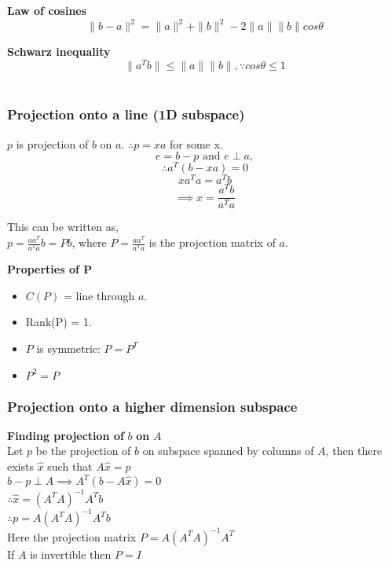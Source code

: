 \textbf{Law of cosines}
$$\|b - a\|^2 = \|a\|^2 + \|b\|^2 - 2\|a\|\|b\|cos\theta$$

\textbf{Schwarz inequality}
$$\|a^Tb\| \leq \|a\|\|b\|, \because cos\theta \leq 1$$\\

\subsubsection{Projection onto a line (1D subspace)}


$p$ is projection of $b$ on $a$. $\therefore p = xa $ for some x.\\

$$e = b - p \text{ and } e \perp  a,$$
$$\therefore a^T(b-xa) = 0$$
$$xa^Ta = a^Tb$$
$$\implies x = \frac{a^Tb}{a^Ta}$$
\begin{center}
\end{center}

This can be written as,\\
$p = \frac{aa^T}{a^Ta}b = Pb$, where $P = \frac{aa^T}{a^Ta}$ is the projection matrix of $a$.
	

\textbf{Properties of P}\\
\begin{itemize}
	\item $C(P)$ = line through $a$.
	\item Rank(P) = 1.
	\item $P$ is symmetric: $P = P^T$
	\item $P^2=P$
\end{itemize}

\subsubsection{Projection onto a higher dimension subspace}

\textbf{Finding projection of } $b$ \textbf{on} $A$\\
Let $p$ be the projection of $b$ on subspace spanned by columns of $A$, 
then there exists $\hat{x}$ such that $A\hat{x} = p$\\
$b - p \perp A \implies A^T(b-A\hat{x}) = 0$ \\
$\therefore \hat{x} = (A^TA)^{-1}A^Tb$\\
$\therefore p = A(A^TA)^{-1}A^Tb$\\
Here the projection matrix $P = A(A^TA)^{-1}A^T$\\
If $A$ is invertible then $P = I$ 

